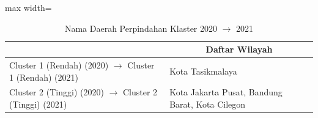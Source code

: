 \begin{table}[H]
\centering
\caption{Nama Daerah Perpindahan Klaster 2020 \(\rightarrow\) 2021} \label{tab:sample1transname2020x2021}
\begin{adjustbox}{max width=\textwidth}
\begin{tabular}{|>{\centering\arraybackslash}p{4cm}|p{10cm}|}
\hline
\multicolumn{1}{|c|}{\textbf{Kategori}} & \multicolumn{1}{c|}{\textbf{Daftar Wilayah}} \\
\hline
Cluster 1 (Rendah) (2020) \(\rightarrow\) Cluster 1 (Rendah) (2021) & Kota Tasikmalaya \\
\hline
Cluster 2 (Tinggi) (2020) \(\rightarrow\) Cluster 2 (Tinggi) (2021) & Kota Jakarta Pusat, Bandung Barat, Kota Cilegon \\
\hline
\end{tabular}
\end{adjustbox}
\end{table}